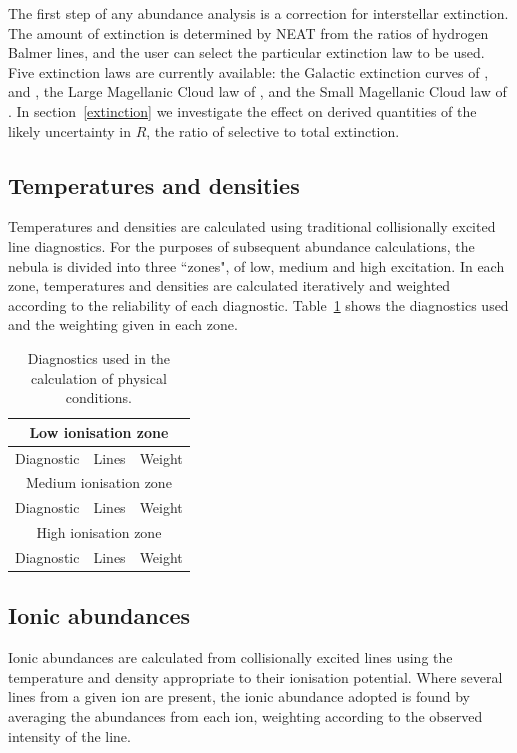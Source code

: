 \documentclass[useAMS,usenatbib]{mn2e}
\begin{document}
The first step of any abundance analysis is a correction for interstellar extinction.  The amount of extinction is determined by NEAT from the ratios of hydrogen Balmer lines, and the user can select the particular extinction law to be used.  Five extinction laws are currently available: the Galactic extinction curves of \citet{1983MNRAS.203..301H}, \citet{1990ApJS...72..163F} and \citet{1989ApJ...345..245C}, the Large Magellanic Cloud law of \citet{1983MNRAS.203..301H}, and the Small Magellanic Cloud law of \citet{1984A&A...132..389P}.  In section~\ref{extinction} we investigate the effect on derived quantities of the likely uncertainty in $R$, the ratio of selective to total extinction.

\subsection{Temperatures and densities}

Temperatures and densities are calculated using traditional collisionally excited line diagnostics.  For the purposes of subsequent abundance calculations, the nebula is divided into three ``zones", of low, medium and high excitation.  In each zone, temperatures and densities are calculated iteratively and weighted according to the reliability of each diagnostic.  Table~\ref{zonestable} shows the diagnostics used and the weighting given in each zone.

\begin{table}
\begin{tabular}{ccc}
\hline
\multicolumn{3}{c}{Low ionisation zone}\\
\hline
Diagnostic & Lines & Weight \\
\hline
\multicolumn{3}{c}{Medium ionisation zone}\\
\hline
Diagnostic & Lines & Weight \\
\hline
\multicolumn{3}{c}{High ionisation zone}\\
\hline
Diagnostic & Lines & Weight \\
\end{tabular}
\label{zonestable}
\caption{Diagnostics used in the calculation of physical conditions.}
\end{table}

\subsection{Ionic abundances}

Ionic abundances are calculated from collisionally excited lines using the temperature and density appropriate to their ionisation potential.  Where several lines from a given ion are present, the ionic abundance adopted is found by averaging the abundances from each ion, weighting according to the observed intensity of the line.
\end{document}
